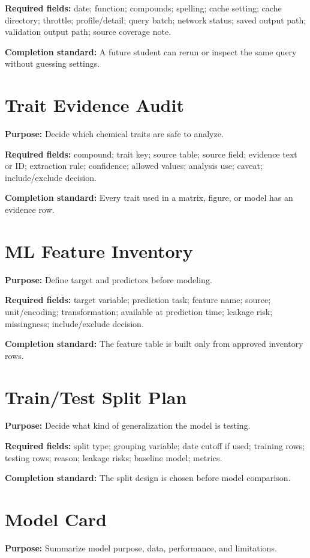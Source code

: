 \textbf{Required fields:} date; function; compounds; spelling; cache setting; cache directory; throttle; profile/detail; query batch; network status; saved output path; validation output path; source coverage note.

\textbf{Completion standard:} A future student can rerun or inspect the same query without guessing settings.

\section{Trait Evidence Audit}
\textbf{Purpose:} Decide which chemical traits are safe to analyze.

\textbf{Required fields:} compound; trait key; source table; source field; evidence text or ID; extraction rule; confidence; allowed values; analysis use; caveat; include/exclude decision.

\textbf{Completion standard:} Every trait used in a matrix, figure, or model has an evidence row.

\section{ML Feature Inventory}
\textbf{Purpose:} Define target and predictors before modeling.

\textbf{Required fields:} target variable; prediction task; feature name; source; unit/encoding; transformation; available at prediction time; leakage risk; missingness; include/exclude decision.

\textbf{Completion standard:} The feature table is built only from approved inventory rows.

\section{Train/Test Split Plan}
\textbf{Purpose:} Decide what kind of generalization the model is testing.

\textbf{Required fields:} split type; grouping variable; date cutoff if used; training rows; testing rows; reason; leakage risks; baseline model; metrics.

\textbf{Completion standard:} The split design is chosen before model comparison.

\section{Model Card}
\textbf{Purpose:} Summarize model purpose, data, performance, and limitations.

